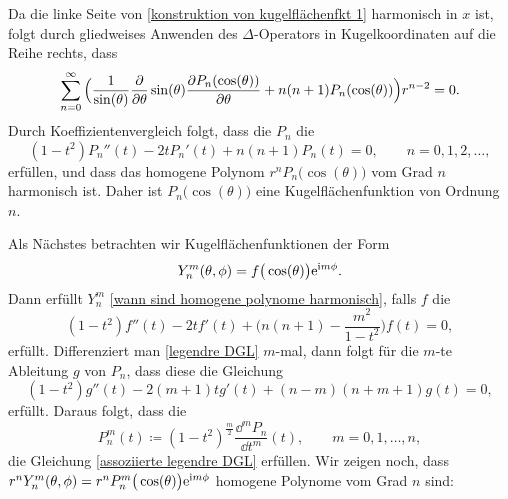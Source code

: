 Da die linke Seite von \eqref{konstruktion von kugelflächenfkt 1} harmonisch in \(x\) ist, folgt durch gliedweises Anwenden des \(\Delta\)-Operators in Kugelkoordinaten auf die Reihe rechts, dass
\begin{equation*}
	\sum_{n=0}^\infty\Big(\frac{1}{\sin(\theta)}\frac{\partial}{\partial\theta}\sin(\theta)\frac{\partial P_n(\cos(\theta))}{\partial\theta}+n(n+1)P_n(\cos(\theta))\Big)r^{n-2}=0.
\end{equation*}
Durch Koeffizientenvergleich folgt, dass die \(P_n\) die 
\begin{equation}
	\label{legendre DGL}
	(1-t^2)P_n''(t)-2tP_n'(t)+n(n+1)P_n(t)=0,\qquad n=0,1,2,\ldots,
\end{equation}
erfüllen, und dass das homogene Polynom \(r^nP_n\big(\cos(\theta)\big)\) vom Grad \(n\) harmonisch ist. Daher ist \(P_n\big(\cos(\theta)\big)\) eine Kugelflächenfunktion von Ordnung \(n\).\vspace{1mm}

Als Nächstes betrachten wir  Kugelflächenfunktionen der Form
\begin{equation*}
	Y_n^m(\theta,\phi)=f\big(\cos(\theta)\big)\mathrm{e}^{\mathrm{i} m\phi}.
\end{equation*}
Dann erfüllt \(Y_n^m\) \eqref{wann sind homogene polynome harmonisch}, falls \(f\) die 
\begin{equation}
	\label{assoziierte legendre DGL}
	(1-t^2)f''(t)-2tf'(t)+\Big(n(n+1)-\frac{m^2}{1-t^2}\Big)f(t)=0,
\end{equation}
erfüllt. Differenziert man \eqref{legendre DGL} \(m\)-mal, dann folgt für die \(m\)-te Ableitung \(g\) von \(P_n\), dass diese die Gleichung
\begin{equation*}
	(1-t^2)g''(t)-2(m+1)tg'(t)+(n-m)(n+m+1)g(t)=0,
\end{equation*}
erfüllt. Daraus folgt, dass die 
\begin{equation}
	\label{assoziierte legendre fkten}
	P_n^m(t)\coloneqq (1-t^2)^\frac{m}{2}\frac{\dd^mP_n}{\dd t^m}(t),\qquad m=0,1,\ldots,n,
\end{equation}
die Gleichung \eqref{assoziierte legendre DGL} erfüllen. Wir zeigen noch, dass \(r^nY_n^m(\theta,\phi)=r^nP_n^m\big(\cos(\theta)\big)\mathrm{e}^{\mathrm{i} m\phi}\) homogene Polynome vom Grad \(n\) sind:\vspace{1mm}


